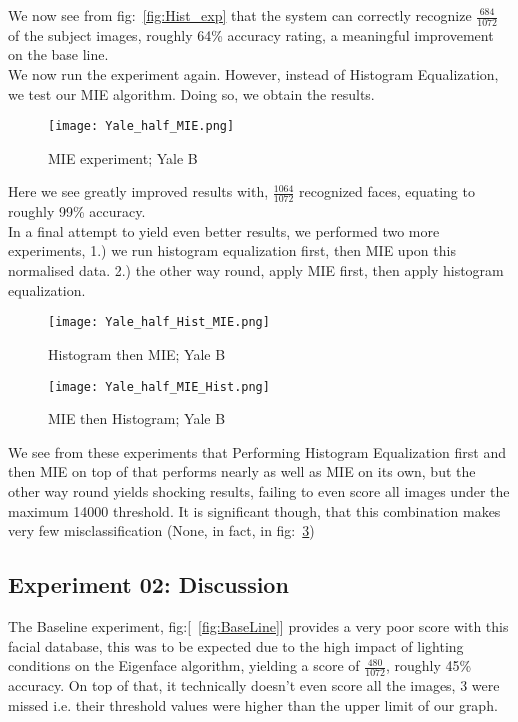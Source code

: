 We now see from fig:~\ref{fig:Hist_exp} that the system can correctly recognize $\frac{684}{1072}$ of the subject images, 
roughly 64\% accuracy rating, a meaningful improvement on the base line.  \\

We now run the experiment again.  However, instead of Histogram Equalization, we test our MIE algorithm.  Doing so, we obtain 
the results.

	\begin{figure}[H]
		\centering
		\caption{MIE experiment; Yale B \label{fig:MIE_exp}}
		\texttt{[image: Yale\_half\_MIE.png]}
	\end{figure}

Here we see greatly improved results with, $\frac{1064}{1072}$ recognized faces, 
equating to roughly 99\% accuracy. \\ 

In a final attempt to yield even better results, we performed two more experiments, 1.) we run histogram equalization first, 
then MIE upon this normalised data. 2.) the other way round, apply MIE first, then apply histogram equalization.
 
 	\begin{figure}[H]
		\centering
		\caption{Histogram then MIE; Yale B \label{fig:Hist_MIE_exp}}
		\texttt{[image: Yale\_half\_Hist\_MIE.png]}
	\end{figure}
	
   	\begin{figure}[H]
		\centering
		\caption{MIE then Histogram; Yale B \label{fig:MIE_Hist_exp}}
		\texttt{[image: Yale\_half\_MIE\_Hist.png]}
	\end{figure}
  
We see from these experiments that Performing Histogram Equalization first and then MIE on top of that performs nearly as 
well as MIE on its own, but the other way round yields shocking results, failing to even score all images under the maximum 
14000 threshold.  It is significant though, that this combination makes very few misclassification (None, in fact, in fig:~\ref{fig:MIE_Hist_exp})

\subsection{Experiment 02: Discussion}
The Baseline experiment, fig:[~\ref{fig:BaseLine}] provides a very poor score with this facial database, this was to be 
expected due to the high impact of lighting conditions on the Eigenface algorithm, yielding a score of $\frac{480}{1072}$, 
roughly 45\% accuracy.  On top of that, it technically doesn't even score all the images, 3 were missed i.e. their threshold 
values were higher than the upper limit of our graph. \\

